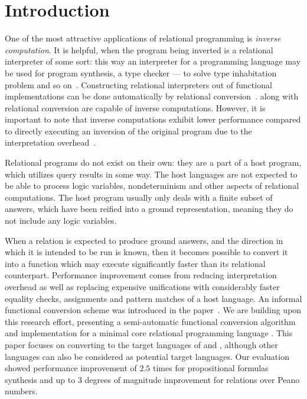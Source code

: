 \section{Introduction}
One of the most attractive applications of relational programming is \emph{inverse computation}.
It is helpful, when the program being inverted is a relational interpreter of some sort: this way an interpreter for a programming language may be used for program synthesis, a type checker --- to solve type inhabitation problem and so on~\cite{Untagged, lozov2019relational}.
Constructing relational interpreters out of functional implementations can be done automatically by relational conversion~\cite{lozov2018typed}.
\mk along with relational conversion are capable of inverse computations.
However, it is important to note that inverse computations exhibit lower performance compared to directly executing an inversion of the original program due to the interpretation overhead~\cite{RevURA,SemanticsModifiers1}.

Relational programs do not exist on their own: they are a part of a host program, which utilizes query results in some way.
The host languages are not expected to be able to process logic variables, nondeterminism and other aspects of relational computations.
The host program usually only deals with a finite subset of answers, which have been reified into a ground representation, meaning they do not include any logic variables.

When a relation is expected to produce ground answers, and the direction in which it is intended to be run is known, then it becomes possible to convert it into a function which may execute significantly faster than its relational counterpart.
Performance improvement comes from reducing interpretation overhead as well as replacing expensive unifications with considerably faster equality checks, assignments and pattern matches of a host language.
An informal functional conversion scheme was introduced in the paper~\cite{verbitskaia2022direction}.
We are building upon this research effort, presenting a semi-automatic functional conversion algorithm and implementation for a minimal core relational programming language \micro.
This paper focuses on converting to the target languages of \haskell and \ocaml, although other languages can also be considered as potential target languages.
Our evaluation showed performance improvement of $2.5$ times for propositional formulas synthesis and up to $3$ degrees of magnitude improvement for relations over Peano numbers. 